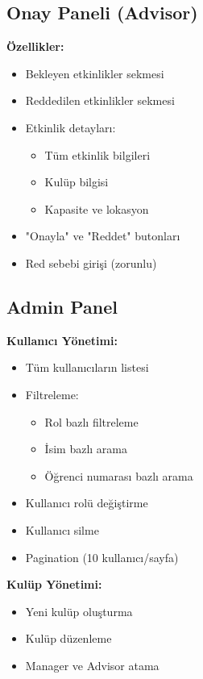 \documentclass[a4paper,12pt]{report}
\begin{document}
\subsection{Onay Paneli (Advisor)}

\textbf{Özellikler:}
\begin{itemize}
    \item Bekleyen etkinlikler sekmesi
    \item Reddedilen etkinlikler sekmesi
    \item Etkinlik detayları:
    \begin{itemize}
        \item Tüm etkinlik bilgileri
        \item Kulüp bilgisi
        \item Kapasite ve lokasyon
    \end{itemize}
    \item "Onayla" ve "Reddet" butonları
    \item Red sebebi girişi (zorunlu)
\end{itemize}

\subsection{Admin Panel}

\textbf{Kullanıcı Yönetimi:}
\begin{itemize}
    \item Tüm kullanıcıların listesi
    \item Filtreleme:
    \begin{itemize}
        \item Rol bazlı filtreleme
        \item İsim bazlı arama
        \item Öğrenci numarası bazlı arama
    \end{itemize}
    \item Kullanıcı rolü değiştirme
    \item Kullanıcı silme
    \item Pagination (10 kullanıcı/sayfa)
\end{itemize}

\textbf{Kulüp Yönetimi:}
\begin{itemize}
    \item Yeni kulüp oluşturma
    \item Kulüp düzenleme
    \item Manager ve Advisor atama
\end{itemize}
\end{document}
